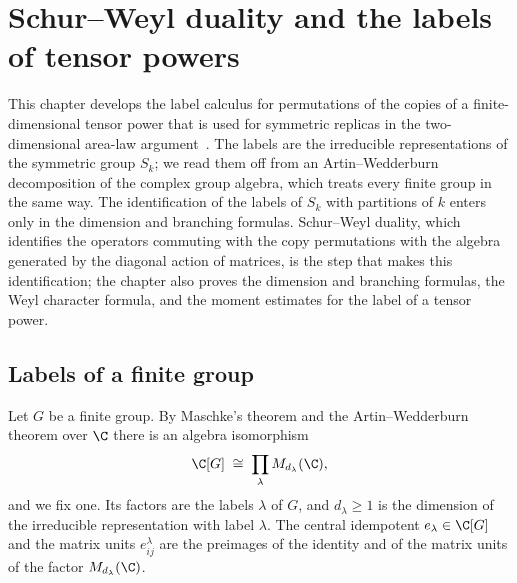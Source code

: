 
\chapter{Schur--Weyl duality and the labels of tensor powers}\label{ch:schur_labels}

This chapter develops the label calculus for permutations of the copies of a
finite-dimensional tensor power that is used for symmetric replicas in the
two-dimensional area-law argument~\cite{OpenAI2026AreaLaw}. The labels are the
irreducible representations of the symmetric group $S_k$; we read them off
from an Artin--Wedderburn decomposition of the complex group algebra, which
treats every finite group in the same way. The identification of the labels of
$S_k$ with partitions of $k$ enters only in the dimension and branching formulas.
Schur--Weyl duality, which identifies the operators commuting with the copy
permutations with the algebra generated by the diagonal action of matrices, is
the step that makes this identification; the chapter also proves the
dimension and branching formulas, the Weyl character formula, and the moment
estimates for the label of a tensor power.

\section{Labels of a finite group}

\begin{definition}
    \label{def:irrep_labels}
    \leanok
    Let $G$ be a finite group. By Maschke's theorem and the Artin--Wedderburn
    theorem over $\C$ there is an algebra isomorphism
    \[
        \C[G]\;\cong\;\prod_{\lambda}M_{d_\lambda}(\C),
    \]
    and we fix one. Its factors are the labels $\lambda$ of $G$, and
    $d_\lambda\ge1$ is the dimension of the irreducible representation with
    label $\lambda$. The central idempotent $e_\lambda\in\C[G]$ and the matrix
    units $e^\lambda_{ij}$ are the preimages of the identity and of the matrix
    units of the factor $M_{d_\lambda}(\C)$.
\end{definition}

